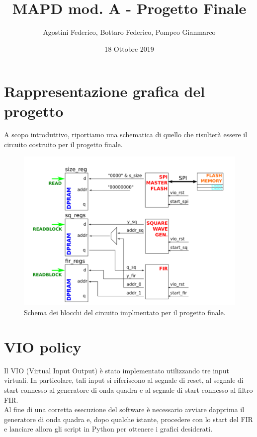 \documentclass[a4paper,11pt]{article}
\title{MAPD mod. A - Progetto Finale}
\author{Agostini Federico, Bottaro Federico, Pompeo Gianmarco}
\date{18 Ottobre 2019}
\begin{document}
\maketitle

\section{Rappresentazione grafica del progetto}
A scopo introduttivo, riportiamo una schematica di quello che risulterà essere il circuito costruito per il progetto finale.
\begin{figure}[H]
    \centering
    \includegraphics[width=1\textwidth]{./Figure/scheme.png}
    \caption{Schema dei blocchi del circuito implmentato per il progetto finale.}
    \label{fig:scheme}
\end{figure}

\section{VIO policy}
Il VIO (Virtual Input Output) è stato implementato utilizzando tre input virtuali. In particolare, tali input si riferiscono al segnale di reset, al segnale di start connesso al generatore di onda quadra e al segnale di start connesso al filtro FIR. 
\\
Al fine di una corretta esecuzione del software è necessario avviare dapprima il generatore di onda quadra e, dopo qualche istante, procedere con lo start del FIR e lanciare allora gli script in Python per ottenere i grafici desiderati.
\end{document}
